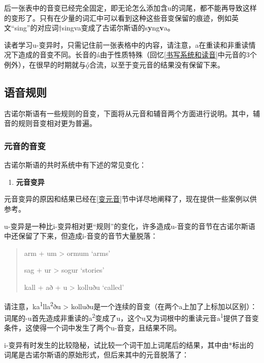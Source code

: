 后一张表中的音变已经完全固定，即无论怎么添加含u的词尾，都不能再导致这样的变形了。只有在少量的词汇中可以看到这种这些音变保留的痕迹，例如英文``sing''的对应词†singva变成了古诺尔斯语的s\textbf{y}ng\textbf{v}a。

读者学习u-变异时，只需记住前一张表格中的内容，请注意，a在重读和非重读情况下造成的音变不同。长音的á由于性质特殊（回忆\ref{书写系统和读音}中元音的3个例外），在很早的时期就与ǫ́合流，以至于变元音的结果没有保留下来。

\subsection{语音规则}\label{语音规则}

古诺尔斯语有一些规则的音变，下面将从元音和辅音两个方面进行说明。其中，辅音的规则音变相对更为普遍。

\subsubsection{元音的音变}\label{元音的音变}

古诺尔斯语的共时系统中有下述的常见变化：

\begin{enumerate}
  \def\labelenumi{\Alph{enumi}.}
  \item
        \label{_Ref117017033}{}\textbf{元音变异}
\end{enumerate}

元音变异的原因和结果已经在\ref{变元音}节中详尽地阐释了，现在提供一些案例以供参考。

u-变异是一种比i-变异相对更``规则''的变化，许多造成u-音变的音节在古诺尔斯语中还保留了下来，但造成i-音变的音节大量脱落：

\begin{quote}
  arm + um \textgreater{} ormum `arms'

  sag + ur \textgreater{} sogur `stories'

  kall + að + u \textgreater{} kolluðu `called'
\end{quote}

请注意，ka\textsuperscript{1}lla\textsuperscript{2}ðu \textgreater{}
kolluðu是一个连续的音变（在两个a上加了上标加以区别）：词尾的-u首先造成非重读的a\textsuperscript{2}变成了u，这个u又为词根中的重读元音a\textsuperscript{1}提供了音变条件，这使得一个词中发生了两个u-音变，且结果不同。

i-变异有时发生的比较隐秘，试比较一个词干加上词尾后的结果，其中由*标出的词尾是古诺尔斯语的原始形式，但后来其中的元音脱落了：


